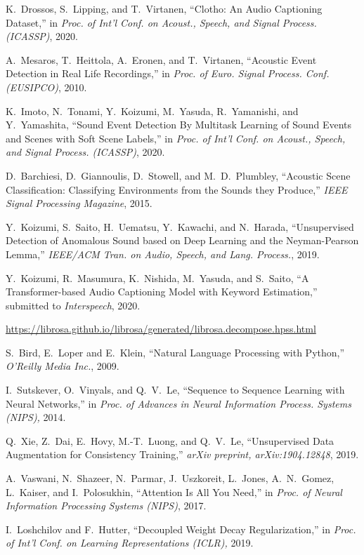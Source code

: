 \documentclass{article}
\begin{document}
\begin{sloppy}
\begin{thebibliography}{99}
 K.\ Drossos, S.\ Lipping, and T.\ Virtanen,
``Clotho: An Audio Captioning Dataset,''
in \textit{Proc. of Int'l Conf. on Acoust., Speech, and Signal Process. (ICASSP)}, 2020.

 A.\ Mesaros, T.\ Heittola, A.\ Eronen, and T.\ Virtanen,
``Acoustic Event Detection in Real Life Recordings,''
in \textit{Proc. of Euro. Signal Process. Conf. (EUSIPCO)}, 2010.

 K.\ Imoto, N.\ Tonami, Y.\ Koizumi, M.\ Yasuda, R.\ Yamanishi, and Y.\ Yamashita,
``Sound Event Detection By Multitask Learning of Sound Events and Scenes with Soft Scene Labels,''
in \textit{Proc. of Int'l Conf. on Acoust., Speech, and Signal Process. (ICASSP)}, 2020.

 D.\ Barchiesi, D.\ Giannoulis, D.\ Stowell, and M.\ D.\ Plumbley,
``Acoustic Scene Classification: Classifying Environments from the Sounds they Produce,''
\textit{IEEE Signal Processing Magazine}, 2015.

 Y.\ Koizumi, S.\ Saito, H.\ Uematsu, Y.\ Kawachi, and N.\ Harada,
``Unsupervised Detection of Anomalous Sound based on Deep Learning and the Neyman-Pearson Lemma,''
\textit{IEEE/ACM Tran. on Audio, Speech, and Lang. Process.}, 2019.



 Y.\ Koizumi, R.\ Masumura, K.\ Nishida, M.\ Yasuda, and S.\ Saito,
``A Transformer-based Audio Captioning Model with Keyword Estimation,''
submitted to 
\textit{Interspeech}, 2020.


 \url{https://librosa.github.io/librosa/generated/librosa.decompose.hpss.html}

 S.\ Bird, E.\ Loper and E.\ Klein,
``Natural Language Processing with Python,''
\textit{O'Reilly Media Inc.}, 2009.

 I.\ Sutskever, O.\ Vinyals, and Q.\ V.\ Le,
``Sequence to Sequence Learning with Neural Networks,''
in \textit{Proc. of Advances in Neural Information Process. Systems (NIPS),} 2014.

Q.\ Xie, Z.\ Dai, E.\ Hovy, M.-T.\ Luong, and Q.\ V.\ Le,
``Unsupervised Data Augmentation for Consistency Training,''
\textit{arXiv preprint, arXiv:1904.12848}, 2019. 

A.\ Vaswani, N.\ Shazeer, N.\ Parmar, J.\ Uszkoreit, L.\ Jones, A.\ N.\ Gomez, L.\ Kaiser, and I.\ Polosukhin,
``Attention Is All You Need,''
in \textit{Proc. of Neural Information Processing Systems (NIPS)}, 2017.


 I.\ Loshchilov and F.\ Hutter,
``Decoupled Weight Decay Regularization,''
in \textit{Proc. of Int'l Conf. on Learning Representations (ICLR),} 2019.


\end{thebibliography}
\end{sloppy}
\end{document}
